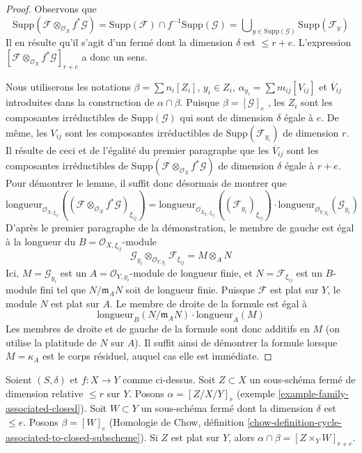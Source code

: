 \begin{proof} 
Observons que 
$$
\text{Supp}(\mathcal{F} \otimes_{\mathcal{O}_X} f^*\mathcal{G}) =
\text{Supp}(\mathcal{F}) \cap f^{-1}\text{Supp}(\mathcal{G}) =
\bigcup\nolimits_{y \in \text{Supp}(\mathcal{G})} \text{Supp}(\mathcal{F}_y)
$$
 Il en résulte qu'il s'agit d'un fermé dont la dimension $\delta$ est $\leq r + e$.
 L'expression 
$[\mathcal{F} \otimes_{\mathcal{O}_X} f^*\mathcal{G}]_{r + e}$
 a donc un sens. 

\medskip\noindent
 Nous utiliserons les notations 
$\beta = \sum n_i[Z_i]$, $y_i \in Z_i$, 
$\alpha_{y_i} = \sum m_{ij} [V_{ij}]$ et 
$\overline{V}_{ij}$ introduites dans la construction 
de $\alpha \cap \beta$. Puisque $\beta = [\mathcal{G}]_e$
 , les $Z_i$ sont les composantes irréductibles de 
$\text{Supp}(\mathcal{G})$ qui sont de dimension $\delta$ égale à $e$.
 De même, les $V_{ij}$ sont les composantes irréductibles 
de $\text{Supp}(\mathcal{F}_{y_i})$ de dimension $r$.
 Il résulte de ceci et de l'égalité du premier 
paragraphe que les $\overline{V}_{ij}$ sont les composantes 
irréductibles de 
$\text{Supp}(\mathcal{F} \otimes_{\mathcal{O}_X} f^*\mathcal{G})$
 de dimension $\delta$ égale à $r + e$.
 Pour démontrer le lemme, il suffit donc désormais de montrer que 
$$
\text{longueur}_{\mathcal{O}_{X, \xi_{ij}}}(
(\mathcal{F} \otimes_{\mathcal{O}_X} f^*\mathcal{G})_{\xi_{ij}})
=
\text{longueur}_{\mathcal{O}_{X_{y_i}, \xi_{ij}}}((\mathcal{F}_{y_i})_{\xi_{ij}})
\cdot
\text{longueur}_{\mathcal{O}_{Y, y_i}}(\mathcal{G}_{y_i})
$$
 D'après le premier paragraphe de la démonstration, le membre de gauche est 
égal à la longueur du $B = \mathcal{O}_{X, \xi_{ij}}$-module 
$$
\mathcal{G}_{y_i}
\otimes_{\mathcal{O}_{Y, y_i}}
\mathcal{F}_{\xi_{ij}} =
M \otimes_A N
$$
 Ici, $M = \mathcal{G}_{y_i}$ est un 
$A = \mathcal{O}_{Y, y_i}$-module de longueur finie, et $N = \mathcal{F}_{\xi_{ij}}$
 est un $B$-module fini tel que $N/\mathfrak m_AN$ soit de longueur finie. 
Puisque $\mathcal{F}$ est plat sur $Y$, le module $N$ est plat sur $A$. Le 
membre de droite de la formule est égal à 
$$
\text{longueur}_B(N/\mathfrak m_A N) \cdot \text{longueur}_A(M)
$$
 Les membres de droite et de gauche de la formule sont donc additifs en $M$
 (on utilise la platitude de $N$ sur $A$). Il suffit ainsi de démontrer la 
formule lorsque $M = \kappa_A$ est le corps résiduel, auquel 
cas elle est immédiate. 
\end{proof} 

\begin{lemma} 
\label{lemma-action-closed} 
Soient $(S, \delta)$ et $f : X \to Y$ comme ci-dessus. Soit $Z \subset X$
 un sous-schéma fermé de dimension relative $\leq r$ sur $Y$. 
Posons $\alpha = [Z/X/Y]_r$ (exemple \ref{example-family-associated-closed}). 
Soit $W \subset Y$ un sous-schéma fermé dont la dimension $\delta$ est $\leq e$. 
Posons $\beta = [W]_e$ (Homologie de Chow, définition 
\ref{chow-definition-cycle-associated-to-closed-subscheme}). 
Si $Z$ est plat sur $Y$, alors $\alpha \cap \beta = [Z \times_Y W]_{r + e}$. 
\end{lemma} 

